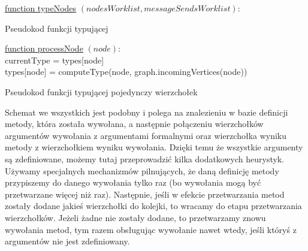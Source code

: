 \documentclass[shortabstract,mgr]{iithesis}
\newcommand{\algsize}{\small}
\begin{document}
\begin{algorithm}
    \algsize
    \underline{function typeNodes} $(\mathit{nodesWorklist}, \mathit{messageSendsWorklist})$:\\
    \caption{Pseudokod funkcji typującej}
    \label{alg:typeNodes}
\end{algorithm}

\begin{algorithm}
    \algsize
    \underline{function processNode} $(\mathit{node})$:\\
    currentType = types[node]\\
    types[node] = computeType(node, graph.incomingVertices(node))\\
    \caption{Pseudokod funkcji typującej pojedynczy wierzchołek}
    \label{alg:processNode}
\end{algorithm}

Schemat we wszystkich jest podobny i polega na znalezieniu w bazie definicji metody, która została wywołana, a następnie połączeniu wierzchołków argumentów wywołania z argumentami formalnymi oraz wierzchołka wyniku metody z wierzchołkiem wyniku wywołania.
Dzięki temu że wszystkie argumenty są zdefiniowane, możemy tutaj przeprowadzić kilka dodatkowych heurystyk.
Używamy specjalnych mechanizmów pilnujących, że daną definicję metody przypiszemy do danego wywołania tylko raz (bo wywołania mogą być przetwarzane więcej niż raz).
Następnie, jeśli w efekcie przetwarzania metod zostały dodane jakieś wierzchołki do kolejki, to wracamy do etapu przetwarzania wierzchołków.
Jeżeli żadne nie zostały dodane, to przetwarzamy znowu wywołania metod, tym razem obsługując wywołanie nawet wtedy, jeśli któryś z argumentów nie jest zdefiniowany.
\end{document}
